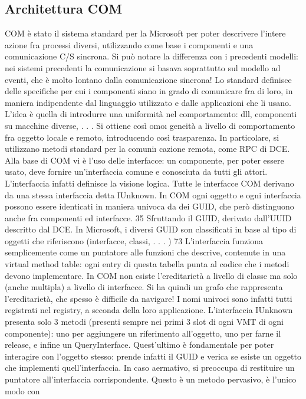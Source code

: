 \subsection{Architettura COM}
COM è stato il sistema standard per la Microsoft per poter descrivere l'intere
azione fra processi diversi, utilizzando come base i componenti e una comunicazione C/S sincrona. Si può notare la
differenza con i precedenti modelli: nei
sistemi precedenti la comunicazione si basava soprattutto sul modello ad eventi,
che è molto lontano dalla comunicazione sincrona!
Lo standard definisce delle specifiche per cui i componenti siano in grado
di comunicare fra di loro, in maniera indipendente dal linguaggio utilizzato e
dalle applicazioni che li usano. L'idea è quella di introdurre una uniformità nel
comportamento: dll, componenti su macchine diverse, . . . Si ottiene così omo\i{}
geneità a livello di comportamento fra oggetto locale e remoto, introducendo
così trasparenza. In particolare, si utilizzano metodi standard per la comuni\i{}
cazione remota, come RPC di DCE.
Alla base di COM vi è l'uso delle interfacce: un componente, per poter
essere usato, deve fornire un'interfaccia comune e conosciuta da tutti gli attori. L'interfaccia infatti definisce la
visione logica. Tutte le interfacce COM
derivano da una stessa interfaccia detta IUnknown. In COM ogni oggetto e ogni
interfaccia possono essere identicati in maniera univoca da dei GUID, che però
distinguono anche fra componenti ed interfacce.
35 Sfruttando il GUID, derivato dall'UUID descritto dal DCE. In Microsoft, i diversi GUID
son classificati in base al tipo di oggetti che riferiscono (interfacce, classi, . . . )
73
L'interfaccia funziona semplicemente come un puntatore alle funzioni che descrive, contenute in una virtual method
table: ogni entry di questa tabella punta
al codice che i metodi devono implementare. In COM non esiste l'ereditarietà
a livello di classe ma solo (anche multipla) a livello di interfacce. Si ha quindi
un grafo che rappresenta l'ereditarietà, che spesso è difficile da navigare! I nomi
univoci sono infatti tutti registrati nel registry, a seconda della loro applicazione.
L'interfaccia IUnknown presenta solo 3 metodi (presenti sempre nei primi
3 slot di ogni VMT di ogni componente): uno per aggiungere un riferimento
all'oggetto, uno per farne il release, e infine un QueryInterface. Quest'ultimo è
fondamentale per poter interagire con l'oggetto stesso: prende infatti il GUID e
verica se esiste un oggetto che implementi quell'interfaccia. In caso aermativo,
si preoccupa di restituire un puntatore all'interfaccia corrispondente. Questo è un metodo pervasivo, è l'unico modo con
